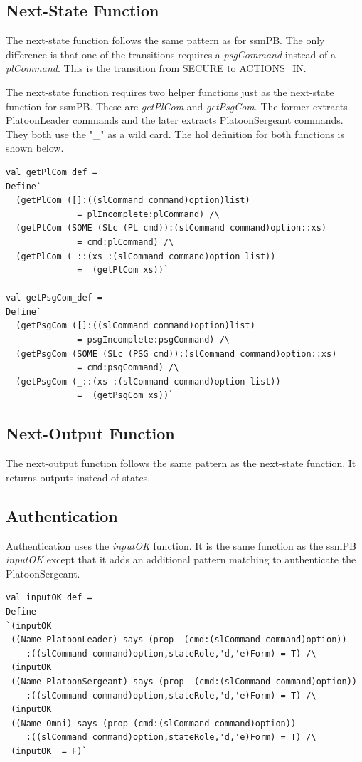\documentclass[../../main/main.tex]{subfiles}
\begin{document}
\subsection{Next-State Function}
The next-state function follows the same pattern as for ssmPB.  The only difference is that one of the transitions requires a \textit{psgCommand} instead of a \textit{plCommand}.  This is the transition from SECURE to ACTIONS_IN.

\HOLssmConductORPTheoremsconductORPNSXXdef

The next-state function requires two helper functions just as the next-state function for ssmPB.  These are \textit{getPlCom} and \textit{getPsgCom}.  The former extracts PlatoonLeader commands and the later extracts PlatoonSergeant commands.  They both use the "_" as a wild card.  The \gls{hol} definition for both functions is shown below.
\begin{lstlisting}
val getPlCom_def =
Define`
  (getPlCom ([]:((slCommand command)option)list)
  		      = plIncomplete:plCommand) /\
  (getPlCom (SOME (SLc (PL cmd)):(slCommand command)option::xs)
  		      = cmd:plCommand) /\
  (getPlCom (_::(xs :(slCommand command)option list))
  		      =  (getPlCom xs))`

val getPsgCom_def =
Define`
  (getPsgCom ([]:((slCommand command)option)list)
  		      = psgIncomplete:psgCommand) /\
  (getPsgCom (SOME (SLc (PSG cmd)):(slCommand command)option::xs)
  		      = cmd:psgCommand) /\
  (getPsgCom (_::(xs :(slCommand command)option list))
  		      =  (getPsgCom xs))`
 \end{lstlisting}


\subsection{Next-Output Function}
The next-output function follows the same pattern as the next-state function.  It returns outputs instead of states.
\HOLssmConductORPTheoremsconductORPOutXXdef

\subsection{Authentication}
Authentication uses the \textit{inputOK} function.  It is the same function as the ssmPB \textit{inputOK} except that it adds an additional pattern matching to authenticate the PlatoonSergeant.

\begin{lstlisting}
val inputOK_def =
Define
`(inputOK
 ((Name PlatoonLeader) says (prop  (cmd:(slCommand command)option))
 	:((slCommand command)option,stateRole,'d,'e)Form) = T) /\
 (inputOK
 ((Name PlatoonSergeant) says (prop  (cmd:(slCommand command)option))
 	:((slCommand command)option,stateRole,'d,'e)Form) = T) /\
 (inputOK
 ((Name Omni) says (prop (cmd:(slCommand command)option))
  	:((slCommand command)option,stateRole,'d,'e)Form) = T) /\
 (inputOK _= F)`
 \end{lstlisting}
\end{document}
